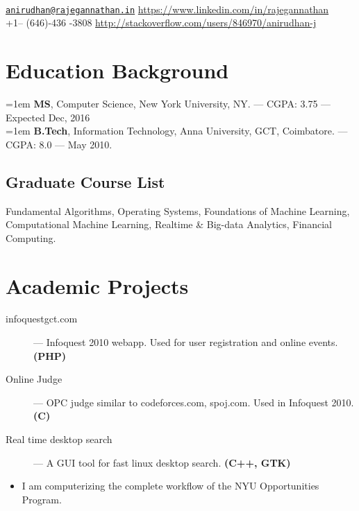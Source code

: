 \documentclass{resume}
\begin{document}
\\
{\href{mailto:anirudhan@rajegannathan.in}{\nolinkurl{anirudhan@rajegannathan.in}} \hfill \url{https://www.linkedin.com/in/rajegannathan}}\\
{+1-- (646)-436 -3808 \hfill \url{http://stackoverflow.com/users/846970/anirudhan-j}}

\section{Education Background}
\noindent \hangindent=1em  \textbf{MS}, Computer Science, New York University, NY\@. --- CGPA\@: 3.75 --- Expected Dec, 2016\\
\noindent \hangindent=1em  \textbf{B.Tech}, Information Technology, Anna University, GCT, Coimbatore. --- CGPA\@: 8.0 --- May 2010.

\subsection{Graduate Course List}
Fundamental Algorithms, Operating Systems, Foundations of Machine Learning, Computational Machine Learning, Realtime \& Big-data Analytics, Financial Computing.

\section{Academic Projects}
\begin{description}
  \item[infoquestgct.com] --- Infoquest 2010 webapp.  Used for user registration and online events. \textbf{(PHP)}
  \item[Online Judge] --- OPC judge similar to codeforces.com, spoj.com.  Used in Infoquest 2010. \textbf{(C)}
  \item[Real time desktop search] --- A GUI tool for fast linux desktop search.  \textbf{(C++, GTK)}
\end{description}

\begin{itemize} \itemsep1pt \parskip0pt
  \item I am computerizing the complete workflow of the NYU Opportunities Program.
\end{itemize}
\end{document}
